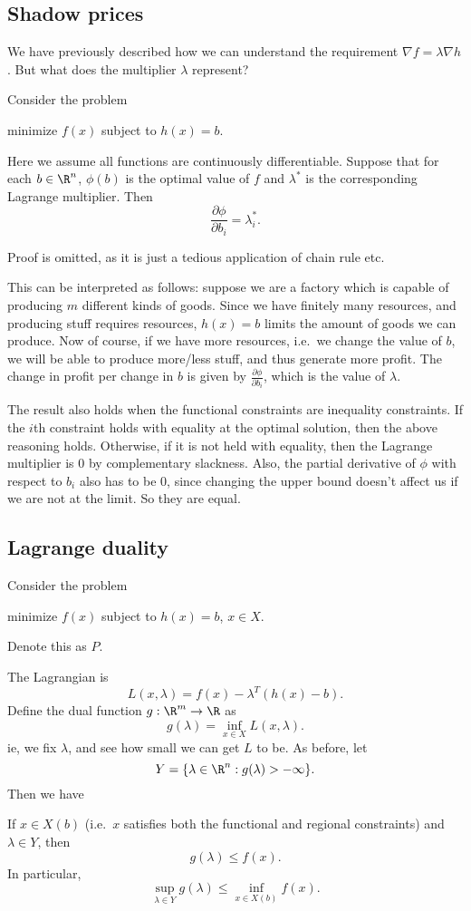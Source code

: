 \documentclass[a4paper]{article}
\begin{document}
\subsection{Shadow prices}
We have previously described how we can understand the requirement $\nabla f = \lambda \nabla h$. But what does the multiplier $\lambda$ represent?
\begin{thm}
  Consider the problem
  \begin{center}
    minimize $f(x)$ subject to $h(x) = b$.
  \end{center}
  Here we assume all functions are continuously differentiable. Suppose that for each $b\in \R^n$, $\phi(b)$ is the optimal value of $f$ and $\lambda^*$ is the corresponding Lagrange multiplier. Then
  \[
    \frac{\partial \phi}{\partial b_i} = \lambda_i^*.
  \]
\end{thm}
Proof is omitted, as it is just a tedious application of chain rule etc.

This can be interpreted as follows: suppose we are a factory which is capable of producing $m$ different kinds of goods. Since we have finitely many resources, and producing stuff requires resources, $h(x) = b$ limits the amount of goods we can produce. Now of course, if we have more resources, i.e.\ we change the value of $b$, we will be able to produce more/less stuff, and thus generate more profit. The change in profit per change in $b$ is given by $\frac{\partial \phi}{\partial b_i}$, which is the value of $\lambda$.

The result also holds when the functional constraints are inequality constraints. If the $i$th constraint holds with equality at the optimal solution, then the above reasoning holds. Otherwise, if it is not held with equality, then the Lagrange multiplier is $0$ by complementary slackness. Also, the partial derivative of $\phi$ with respect to $b_i$ also has to be $0$, since changing the upper bound doesn't affect us if we are not at the limit. So they are equal.
\subsection{Lagrange duality}
Consider the problem
\begin{center}
  minimize $f(x)$ subject to $h(x) = b$, $x\in X$.
\end{center}
Denote this as $P$.

The Lagrangian is
\[
  L(x, \lambda) = f(x) - \lambda^T (h(x) - b).
\]
Define the dual function $g: \R^m \to \R$ as
\[
  g(\lambda) = \inf_{x\in X}L(x, \lambda).
\]
ie, we fix $\lambda$, and see how small we can get $L$ to be. As before, let
\[
  Y = \{\lambda\in \R^n: g(\lambda) > -\infty\}.
\]
Then we have
\begin{thm}
  If $x\in X(b)$ (i.e.\ $x$ satisfies both the functional and regional constraints) and $\lambda \in Y$, then
  \[
    g(\lambda) \leq f(x).
  \]
  In particular,
  \[
    \sup_{\lambda\in Y}g(\lambda) \leq \inf_{x\in X(b)}f(x).
  \]
\end{thm}
\end{document}
